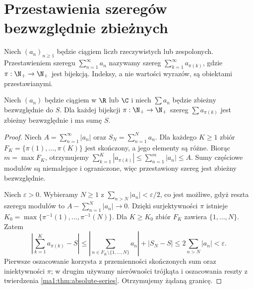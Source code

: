 \section{Przestawienia szeregów bezwzględnie zbieżnych}
\begin{definicja}
\label{ma1:def:series-rearrangement}
Niech $(a_n)_{n\ge1}$ będzie ciągiem liczb rzeczywistych lub zespolonych. Przestawieniem szeregu $\sum_{n=1}^\infty a_n$ nazywamy szereg $\sum_{k=1}^\infty a_{\pi(k)}$, gdzie $\pi:\N_+\to\N_+$ jest bijekcją. Indeksy, a nie wartości wyrazów, są obiektami przestawianymi.
\end{definicja}
\begin{twierdzenie}
\label{ma1:thm:absolute-rearrangement}
Niech $(a_n)$ będzie ciągiem w $\R$ lub $\C$ i niech $\sum a_n$ będzie zbieżny bezwzględnie do $S$. Dla każdej bijekcji $\pi:\N_+\to\N_+$ szereg $\sum a_{\pi(k)}$ jest zbieżny bezwzględnie i ma sumę $S$.
\end{twierdzenie}
\begin{proof}
Niech $A=\sum_{n=1}^\infty |a_n|$ oraz $S_N=\sum_{n=1}^N a_n$. Dla każdego $K\ge1$ zbiór $F_K=\{\pi(1),\ldots,\pi(K)\}$ jest skończony, a jego elementy są różne. Biorąc $m=\max F_K$, otrzymujemy $\sum_{k=1}^K|a_{\pi(k)}|\le\sum_{n=1}^m|a_n|\le A$. Sumy częściowe modułów są niemalejące i ograniczone, więc przestawiony szereg jest zbieżny bezwzględnie.

Niech $\varepsilon>0$. Wybieramy $N\ge1$ z $\sum_{n>N}|a_n|<\varepsilon/2$, co jest możliwe, gdyż reszta szeregu modułów to $A-\sum_{n=1}^N|a_n|\to0$. Dzięki surjektywności $\pi$ istnieje
$K_0=\max\{\pi^{-1}(1),\ldots,\pi^{-1}(N)\}$.
Dla $K\ge K_0$ zbiór $F_K$ zawiera $\{1,\ldots,N\}$. Zatem
\[
 \left|\sum_{k=1}^K a_{\pi(k)}-S\right|
 \le\left|\sum_{n\in F_K\setminus\{1,\ldots,N\}}a_n\right|
       +|S_N-S|
 \le 2\sum_{n>N}|a_n|<\varepsilon.
\]
Pierwsze oszacowanie korzysta z przemienności skończonych sum oraz iniektywności $\pi$; w drugim używamy nierówności trójkąta i oszacowania reszty z twierdzenia \ref{ma1:thm:absolute-series}. Otrzymujemy żądaną granicę.
\end{proof}

